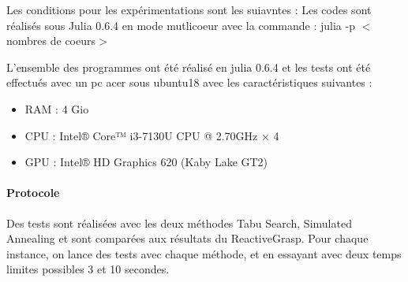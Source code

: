 %
%

\vspace{5mm}
\noindent
{}
\vspace{2mm}


Les conditions pour les expérimentations sont les suiavntes : 
Les codes sont réalisés sous Julia 0.6.4 en mode mutlicoeur avec la commande : julia -p $<$nombres de coeurs$>$

L'ensemble des programmes ont été réalisé en julia 0.6.4 et les tests ont été effectués avec un pc acer sous ubuntu18 avec les caractéristiques suivantes : 
\begin{itemize}
\item RAM : 4 Gio
\item CPU : Intel® Core™ i3-7130U CPU @ 2.70GHz × 4 
\item GPU : Intel® HD Graphics 620 (Kaby Lake GT2)
\end{itemize}


\paragraph{Protocole}
Des tests sont réalisées avec les deux méthodes Tabu Search, Simulated Annealing et sont comparées aux résultats du ReactiveGrasp.
Pour chaque instance, on lance des tests avec chaque méthode, et en essayant avec deux temps limites possibles 3 et 10 secondes.


